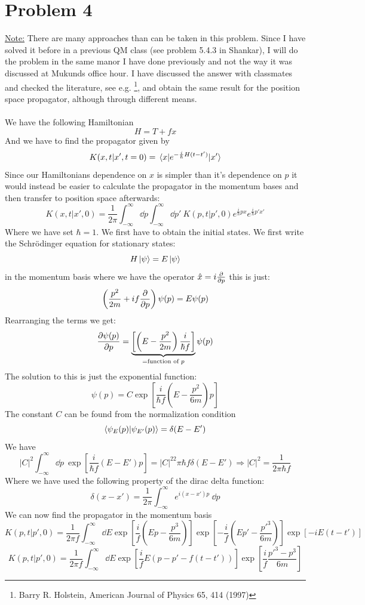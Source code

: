 \documentclass[a4paper,11pt]{article}
\newcommand{\be}{\begin{equation}}
\newcommand{\ee}{\end{equation}}
\newcommand{\ham}{H}
\newcommand{\kin}{T}
\begin{document}
\section*{Problem 4}
\underline{Note:} There are many approaches than can be taken in this problem. Since I have solved it before in a previous QM class (see problem 5.4.3 in Shankar), I will do the problem in the same manor I have done previously and not the way it was discussed at Mukunds office hour. I have discussed the answer with classmates and checked the literature, see e.g. \footnote{Barry R. Holstein, American Journal of Physics 65, 414 (1997)}, and obtain the same result for the position space propagator, although through different means.\\\\
We have the following Hamiltonian
\be
\ham=\kin+fx
\ee
And we have to find the propagator given by
\be
K(x,t|x',t=0)=\mel{x}{e^{-\frac{i}{\hbar}\ham (t-t')}}{x'}
\ee
Since our Hamiltonians dependence on $x$ is simpler than it's dependence on $p$ it would instead be easier to calculate the propagator in the momentum bases and then transfer to position space afterwards:
\[
K(x,t|x',0)=\frac{1}{2\pi}\int^{\infty}_{-\infty}\dd p\int^{\infty}_{-\infty}\dd p'\: K(p,t|p',0)e^{\frac{i}{\hbar}px}e^{\frac{i}{\hbar}p'x'}
\]
Where we have set $\hbar=1$. We first have to obtain the initial states. We first write the Schrödinger equation for stationary states:
\be
\ham\ket{\psi}=E\ket{\psi}
\ee
in the momentum basis where we have the operator $\hat{x}=i\pdv{}{p}$ this is just:
\be
\left(\frac{p^2}{2m}+if \pdv{}{p}\right)\psi(p)=E\psi(p)
\ee
Rearranging the terms we get:
\[
\pdv{\psi(p)}{p}= \underbrace{\left[\left( E-\frac{p^2}{2m} \right)\frac{i}{\hbar f}\right]}_{=\text{function of } p}\psi(p)
\]
The solution to this is just the exponential function:
\[
\psi(p)=C\exp[\frac{i}{\hbar f}\left( E-\frac{p^2}{6m} \right)p]
\]
The constant $C$ can be found from the normalization condition
\be
\braket{\psi_E(p)}{\psi_{E'}(p)}=\delta(E-E')
\ee
We have
\[
|C|^2\int^{\infty}_{-\infty}\dd p\:\exp[\frac{i}{\hbar f}\left( E-E' \right)p]
=|C|^22\pi\hbar f\delta(E-E')\Rightarrow |C|^2=\frac{1}{2\pi\hbar f}
\]
Where we have used the following property of the dirac delta function:
\[
\delta(x-x')=\frac{1}{2\pi}\int^{\infty}_{-\infty}e^{i(x-x')p}\:\dd p
\]
We can now find the propagator in the momentum basis
\[
K(p,t|p',0)=\frac{1}{2\pi f}\int^{\infty}_{-\infty}\dd E \exp[\frac{i}{ f}\left( Ep-\frac{p^3}{6m} \right)]\exp[-\frac{i}{ f}\left( Ep'-\frac{p'^3}{6m} \right)]\exp[-iE(t-t')]
\]
\[
K(p,t|p',0)=\frac{1}{2\pi f}\int^{\infty}_{-\infty}\dd E \exp[\frac{i}{ f}E\left( p-p'-f(t-t') \right)]\exp[\frac{i}{ f}\frac{p'^3-p^3}{6m}]
\]
\end{document}
